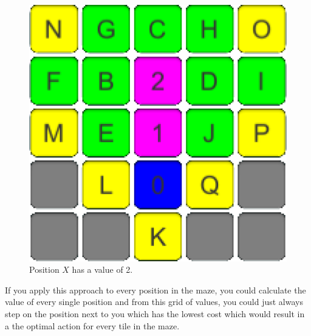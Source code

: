 \documentclass[conference]{IEEEtran}
\begin{document}
\begin{figure}[h]
\begin{minipage}[t]{0.3\linewidth}
\includegraphics[width=1\textwidth]{images/ValueFunction/05.png}
\caption{Position $X$ has a value of 2.}
\end{minipage}
\end{figure}
\newpage
If you apply this approach to every position in the maze, you could calculate the value of every single position and from this grid of values, you could just always step on the position next to you which has the lowest cost which would result in a the optimal action for every tile in the maze.
\end{document}
